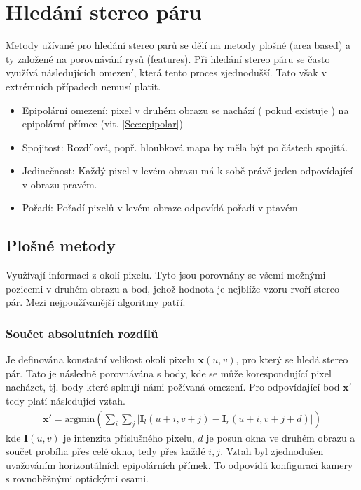 \documentclass[twoside]{ctuthesis}
\newcommand{\tl}[1]{$\mathbf{#1}$}
\begin{document}
\section{Hledání stereo páru}
Metody užívané pro hledání stereo parů se dělí na metody plošné (area based) a ty založené na porovnávání rysů (features). Při hledání stereo páru se často využívá následujících omezení, která tento proces zjednodušší. Tato však v extrémních případech nemusí platit.
\begin{itemize}
    \item Epipolární omezení: pixel v druhém obrazu se nachází ( pokud existuje ) na epipolární přímce (vit. \ref{Sec:epipolar})
    \item Spojitost: Rozdílová, popř. hloubková mapa by měla být po částech spojitá.
    \item Jedinečnost: Každý pixel v levém obrazu má k sobě právě jeden odpovídající v obrazu pravém. 
    \item Pořadí: Pořadí pixelů v levém obraze odpovídá pořadí v ptavém
\end{itemize}

\subsection{Plošné metody}
Využívají informaci z okolí pixelu. Tyto jsou porovnány se všemi možnými pozicemi v druhém obrazu a bod, jehož hodnota je nejblíže vzoru rvoří stereo pár. Mezi nejpoužívanější algoritmy patří.

\subsubsection{Součet absolutních rozdílů}
Je definována konstatní velikost okolí pixelu $\mathbf{x}(u,v)$, pro který se hledá stereo pár. Tato je následně porovnávána s body, kde se může korespondující pixel nacházet, tj. body které splnují námi požívaná omezení. Pro odpovídající bod \tl{x'} tedy platí následující vztah. 
\begin{align}
    \mathbf{x'} = \text{argmin}\left( \displaystyle\sum_i \displaystyle\sum_j |\mathbf{I}_l(u+i,v+j) - \mathbf{I}_r(u+i, v+j + d)| \right)
\end{align}
kde $\mathbf{I}(u,v)$ je intenzita příslušného pixelu, $d$ je posun okna ve druhém obrazu a součet probíha přes celé okno, tedy přes každé $i,j$. Vztah byl zjednodušen uvažováním horizontálních epipolárních přímek. To odpovídá konfiguraci kamery s rovnoběžnými optickými osami.
\end{document}
